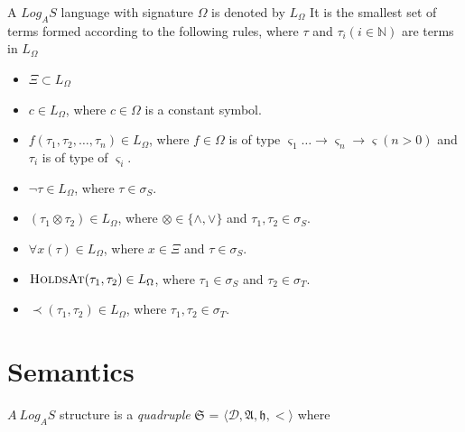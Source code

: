 A $Log_AS$ language with signature $\Omega$ is denoted by $L_{\Omega}$ It
is the smallest set of terms formed according to the following
rules, where $\tau$ and $\tau_i (i \in \mathbb{N})$ are terms in $L_{\Omega}$

\begin{itemize}
  \item $\Xi \subset L_{\Omega}$
  \item $c \in L_{\Omega}$, where $c \in \Omega$ is a constant symbol.
  \item $f(\tau_1, \tau_2, \dots, \tau_n) \in L_{\Omega}$, where $f \in \Omega$ is of type
        $\varsigma_1 \dots \to \varsigma_n \to \varsigma  (n > 0)$ and $\tau_i$ is of type of $\varsigma_i$.
  \item $\neg \tau \in L_{\Omega}$, where $\tau \in \sigma_S$.
  \item $(\tau_1 \otimes \tau_2) \in L_{\Omega}$, where $\otimes \in \{\land, \lor\}$ and $\tau_1, \tau_2 \in \sigma_S$.
  \item $\forall x(\tau) \in L_{\Omega}$, where $x \in \Xi$ and $\tau \in \sigma_S$.
  \item $\textsc{HoldsAt}(\tau_1, \tau_2) \in L_{\Omega}$, where $\tau_1 \in \sigma_S$ and $\tau_2 \in \sigma_T$.
  \item $\prec(\tau_1, \tau_2) \in L_{\Omega}$, where $\tau_1, \tau_2 \in \sigma_T$.
\end{itemize}


\section{Semantics}

\begin{defn} $A  \ Log_AS$ structure is a \textit{quadruple} $\mathfrak{S}$
  = $\langle \mathcal{D}, \mathfrak{A}, \mathfrak{h}, < \rangle$ where
\end{defn}


